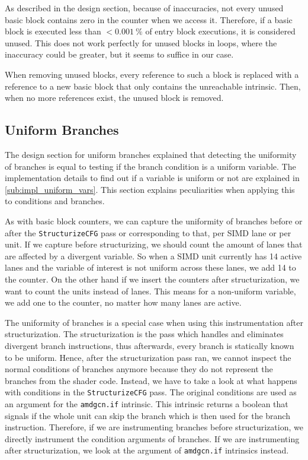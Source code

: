 As described in the design section, because of inaccuracies, not every unused basic block contains zero in the counter when we access it.
Therefore, if a basic block is executed less than $< \SI{0.001}{\percent}$ of entry block executions, it is considered unused.
This does not work perfectly for unused blocks in loops, where the inaccuracy could be greater, but it seems to suffice in our case.

When removing unused blocks, every reference to such a block is replaced with a reference to a new basic block that only contains the unreachable intrinsic.
Then, when no more references exist, the unused block is removed.

\subsection{Uniform Branches}
\label{sub:impl_uniform_branches}
The design section for uniform branches explained that detecting the uniformity of branches is equal to testing if the branch condition is a uniform variable.
The implementation details to find out if a variable is uniform or not are explained in \cref{sub:impl_uniform_vars}.
This section explains peculiarities when applying this to conditions and branches.

As with basic block counters, we can capture the uniformity of branches before or after the \texttt{StructurizeCFG} pass or corresponding to that, per SIMD lane or per unit.
If we capture before structurizing, we should count the amount of lanes that are affected by a divergent variable.
So when a SIMD unit currently has 14 active lanes and the variable of interest is not uniform across these lanes, we add 14 to the counter.
On the other hand if we insert the counters after structurization, we want to count the units instead of lanes.
This means for a non-uniform variable, we add one to the counter, no matter how many lanes are active.

The uniformity of branches is a special case when using this instrumentation after structurization.
The structurization is the pass which handles and eliminates divergent branch instructions, thus afterwards, every branch is statically known to be uniform.
Hence, after the structurization pass ran, we cannot inspect the normal conditions of branches anymore because they do not represent the branches from the shader code.
Instead, we have to take a look at what happens with conditions in the \texttt{StructurizeCFG} pass.
The original conditions are used as an argument for the \texttt{amdgcn.if} intrinsic.
This intrinsic returns a boolean that signals if the whole unit can skip the branch which is then used for the branch instruction.
Therefore, if we are instrumenting branches before structurization, we directly instrument the condition arguments of branches.
If we are instrumenting after structurization, we look at the argument of \texttt{amdgcn.if} intrinsics instead.

